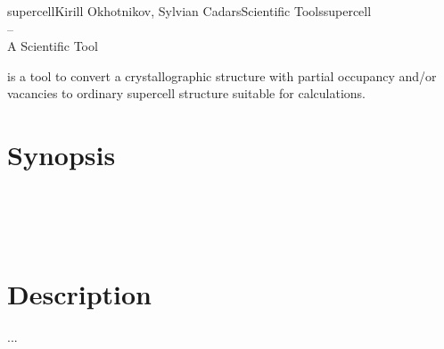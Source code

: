 \documentclass[a4paper,english]{article}
\begin{document}
\begin{Name}{1}{supercell}{Kirill Okhotnikov, Sylvian Cadars}{Scientific Tools}{supercell\\--\\ A Scientific Tool}

   is a tool to convert a crystallographic structure with partial occupancy and/or vacancies to  ordinary supercell structure suitable for calculations.
\end{Name}

\section{Synopsis}

 \\
   \\
   \\

\section{Description}
 ... 
\end{document}
